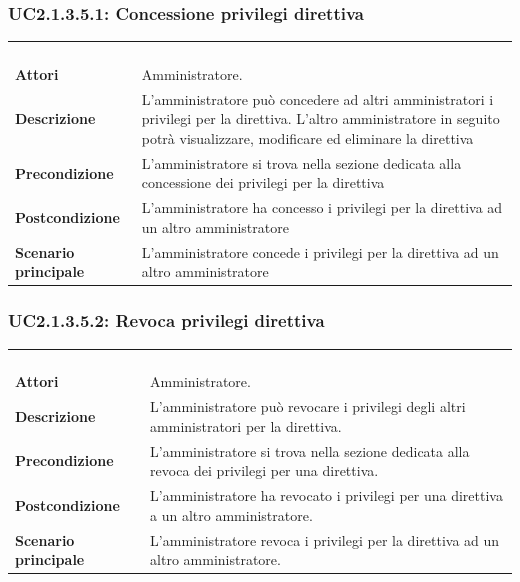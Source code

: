 \subsubsection{UC2.1.3.5.1: Concessione privilegi direttiva}
\label{UC2.1.3.5.1}
\begin{longtable}{l|p{10cm}}
\rowcolor[gray]{0.8} \multicolumn{2}{c}{} \\
\rowcolor[gray]{0.8} \multicolumn{2}{c}{\textbf{UC2.1.3.5.1 - Concessione privilegi direttiva}} \\
\rowcolor[gray]{0.8} \multicolumn{2}{c}{} \\
\hline
&\\
\textbf{Attori} & Amministratore.\\[7pt]
\textbf{Descrizione} & L'amministratore può concedere ad altri amministratori i privilegi per la direttiva. L'altro amministratore in seguito potrà visualizzare, modificare ed eliminare la direttiva\\[7pt]
\textbf{Precondizione} & L'amministratore si trova nella sezione dedicata alla concessione dei privilegi per la direttiva\\[7pt]
\textbf{Postcondizione} & L'amministratore ha concesso i privilegi per la direttiva ad un altro amministratore\\[7pt]
\textbf{Scenario principale} &L'amministratore concede i privilegi per la direttiva ad un altro amministratore\\[7pt]\hline
\end{longtable}

\subsubsection{UC2.1.3.5.2: Revoca privilegi direttiva}
\label{UC2.1.3.5.2}
\begin{longtable}{l|p{10cm}}
\rowcolor[gray]{0.8} \multicolumn{2}{c}{} \\
\rowcolor[gray]{0.8} \multicolumn{2}{c}{\textbf{UC2.1.3.5.2 - Revoca privilegi direttiva}} \\
\rowcolor[gray]{0.8} \multicolumn{2}{c}{} \\
\hline
&\\
\textbf{Attori} & Amministratore.\\[7pt]
\textbf{Descrizione} & L'amministratore può revocare i privilegi degli altri amministratori per la direttiva.\\[7pt]
\textbf{Precondizione} & L'amministratore si trova nella sezione dedicata alla revoca dei privilegi per una direttiva.\\[7pt]
\textbf{Postcondizione} & L'amministratore ha revocato i privilegi per una direttiva a un altro amministratore.\\[7pt]
\textbf{Scenario principale} &L'amministratore revoca i privilegi per la direttiva ad un altro amministratore.\\[7pt]\hline
\end{longtable}

